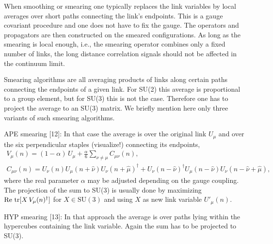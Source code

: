 When smoothing or smearing one typically replaces the link variables by local
averages over short paths connecting the link's endpoints. This is a gauge
covariant procedure and one does not have to fix the gauge. The operators and
propagators are then constructed on the smeared configurations. As long as the
smearing is local enough, i.e., the smearing operator combines only a fixed
number of links, the long distance correlation signals should not be affected
in the continuum limit.

Smearing algorithms are all averaging products of links along certain paths
connecting the endpoints of a given link. For SU(2) this average is
proportional to a group element, but for SU(3) this is not the case. Therefore
one has to project the average to an SU(3) matrix. We briefly mention here only
three variants of such smearing algorithms.

APE smearing [12]: In that case the average is over the original link $U_\mu$
and over the six perpendicular staples (visualize!) connecting its endpoints,
\begin{equation}
  \begin{gathered}
    V_\mu(n) = (1 - \alpha)\, U_\mu + \frac{\alpha}{6}\sum_{\nu\neq\mu}
      C_{\mu\nu}(n) , \\
    C_{\mu\nu}(n) = U_\nu(n) U_\mu(n+\hat\nu) U_\nu(n+\hat\mu)^\dagger
      + U_\nu(n-\hat\nu)^\dagger U_\mu(n-\hat\nu)
      U_\nu(n-\hat\nu+\hat\mu) ,
  \end{gathered}
\end{equation}
where the real parameter $\alpha$ may be adjusted depending on the gauge
coupling. The projection of the sum to SU(3) is usually done by maximizing
$\operatorname{Re}\,\operatorname{tr}[X\, V_\mu(n)^\dagger]$ for $X \in \mathrm{SU}(3)$ and using $X$ as new
link variable $U'_\mu(n)$.

HYP smearing [13]: In that approach the average is over paths lying within the
hypercubes containing the link variable. Again the sum has to be projected to
SU(3).

